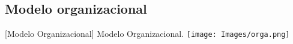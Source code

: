 \subsection{Modelo organizacional}
\vspace{2mm}
        \begin{minipage}{0.9\textwidth}
        \centering
        [{Modelo Organizacional}]{ Modelo Organizacional.  }
        \label{ModeloOrganizacional}
         \texttt{[image: Images/orga.png]}
\end{minipage}